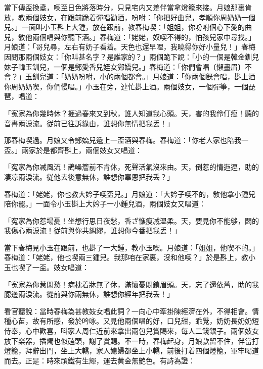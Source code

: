 當下傳盃換盞，喫至日色將落時分，只見宅内又差伴當拿燈籠來接。月娘那裏肯放，教兩個妓女，在跟前跪着彈唱勸酒，吩咐：「你把好曲兒，孝順你周奶奶一個兒。」一面叫小玉斟上大鍾，放在跟前，教春梅喫：「姐姐，你吩咐個心下愛的曲兒，敎他兩個唱與你聽下酒。」春梅道：「姥姥，奴喫不得的，怕孩兒家中尋找。」月娘道：「哥兒尋，左右有奶子看着。天色也還早哩，我曉得你好小量兒！」春梅因問那兩個妓女：「你叫甚名字？是誰家的？」兩個跪下說：「小的一個是韓金釧兒妹子韓玉釧兒，一個是鄭愛香兒姪女鄭嬌兒。」春梅道：「你們會唱〔懶畫眉〕不會？」玉釧兒道：「奶奶吩咐，小的兩個都會。」月娘道：「你兩個旣會唱，斟上酒你周奶奶喫，你們慢唱。」小玉在旁，連忙斟上酒。兩個妓女，一個彈箏，一個琵琶，唱道：

\begin{myquote}
「寃家為你幾時休？捱過春來又到秋，誰人知道我心頭。天，害的我伶仃瘦！聽的音書兩淚流。従前已往訴緣由，誰想你無情把我丢！」
\end{myquote}

那春梅喫過。月娘又令鄭嬌兒遞上一盃酒與春梅。春梅道：「你老人家也陪我一盃。」兩家於是都齊斟上，兩個妓女又唱道：

\begin{myquote}
「寃家為你减風流！鵲噪簷前不肯休，死聲活氣沒來由。天，倒惹的情迤逗，助的凄凉兩淚流。従他去後意無休，誰想你辜恩把我丢？」
\end{myquote}

春梅道：「姥姥，你也教大妗子喫盃兒。」月娘道：「大妗子喫不的，敎他拿小鍾兒陪你罷。」一面令小玉斟上大妗子一小鍾兒酒，兩個妓女又唱道：

\begin{myquote}
「寃家為你惹場憂！坐想行思日夜愁，香ざ憔瘦减溫柔。天，要見你不能够，悶的我傷心兩淚流！従前與你共綢繆，誰想你今番把我丢！」
\end{myquote}

當下春梅見小玉在跟前，也斟了一大鍾，教小玉喫。月娘道：「姐姐，他喫不的。」春梅道：「姥姥，他也喫兩三鍾兒。我那咱在家裏，沒和他喫？」於是斟上，教小玉也喫了一盃。妓女唱道：

\begin{myquote}
「寃家為你惹閑愁！病枕着牀無了休，滿懷憂悶鎖眉頭。天，忘了還依舊，助的我腮邊兩淚流。從前與你兩無休，誰想你經年把我丢！」
\end{myquote}

看官聽說：當時春梅為甚教妓女唱此詞？一向心中牽掛陳經濟在外，不得相會。情種心苗，故有所感，發於吟咏。又見他兩個唱的好，口兒甜，乖覺，奶奶長奶奶短侍奉，心中歡喜，呌家人周仁近前來拿出兩包兒賞賜來，每人二錢銀子。兩個妓女放下楽器，插燭也似磕頭，謝了賞賜。不一時，春梅起身，月娘款留不住，伴當打燈籠，拜辭出門，坐上大轎，家人媳婦都坐上小轎，前後打着四個燈籠，軍牢喝道而去。正是：時來頑鐵有生輝，運去黄金無艷色。有詩為證：

